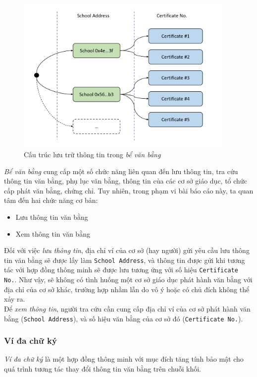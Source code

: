 \begin{figure}[!ht]
    \centering
    \includegraphics[width=400px]{images/certs-tree.png}
    \caption{Cấu trúc lưu trữ thông tin trong \textit{bể văn bằng}}
\end{figure}

\textit{Bể văn bằng} cung cấp một số chức năng liên quan đến lưu thông tin, tra cứu thông tin văn bằng, phụ lục văn bằng, thông tin của các cơ sở giáo dục, tổ chức cấp phát văn bằng, chứng chỉ. Tuy nhiên, trong phạm vi bài báo cáo này, ta quan tâm đến hai chức năng cơ bản:
\begin{itemize}
    \item Lưu thông tin văn bằng
    \item Xem thông tin văn bằng
\end{itemize}

Đối với việc \textit{lưu thông tin}, địa chỉ ví của cơ sở (hay người) gửi yêu cầu lưu thông tin văn bằng sẽ được lấy làm \texttt{School Address}, và thông tin được gửi khi tương tác với hợp đồng thông minh sẽ được lưu tương ứng với số hiệu \texttt{Certificate No.}. Như vậy, sẽ không có tình huống một cơ sở giáo dục phát hành văn bằng với địa chỉ của cơ sở khác, trường hợp nhầm lẫn do vô ý hoặc có chủ đích không thể xảy ra.\\

Để \textit{xem thông tin}, người tra cứu cần cung cấp địa chỉ ví của cơ sở phát hành văn bằng (\texttt{School Address}), và số hiệu văn bằng của cơ sở đó (\texttt{Certificate No.}).

\subsubsection{Ví đa chữ ký}
\textit{Ví đa chữ ký} là một hợp đồng thông minh với mục đích tăng tính bảo mật cho quá trình tương tác thay đổi thông tin văn bằng trên chuỗi khối.\\

